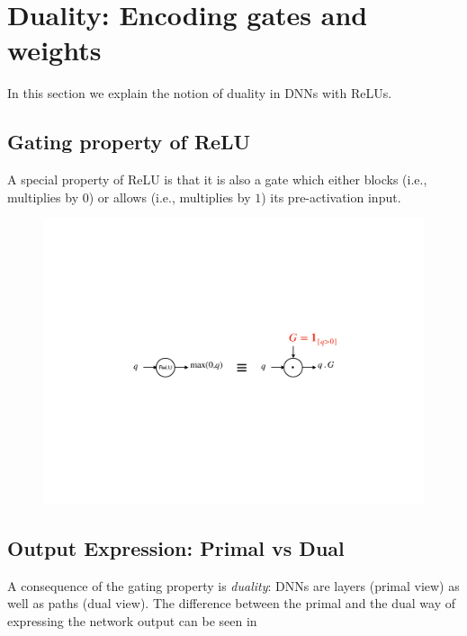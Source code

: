 \section{Duality: Encoding gates and weights}
In this section we explain the notion of duality in DNNs with ReLUs. 
\subsection{Gating property of ReLU}
A special property of ReLU is that it is also a gate which either blocks (i.e., multiplies by $0$) or allows (i.e., multiplies by $1$) its pre-activation input. 
\FloatBarrier
\begin{figure}[H]
\includegraphics[scale=0.4]{figs/gating.pdf}
\end{figure}
\subsection{Output Expression: Primal vs Dual}
A consequence of the gating property is \emph{duality}: DNNs are layers (primal view) as well as paths (dual view). The difference between the primal and the dual way of expressing the network output can be seen in 
\FloatBarrier
\begin{table}[H]
\caption{$\Theta(l),l=1,\ldots,d$ is the weight of layer $l$.}
\label{tb:primal-dual}
\end{table}
